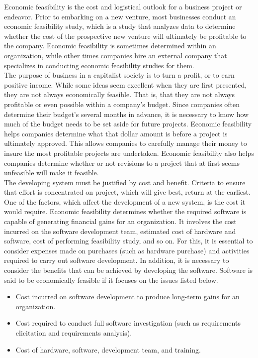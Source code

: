 Economic feasibility is the cost and logistical outlook for a business project or endeavor. Prior to embarking on a new venture, most businesses conduct an economic feasibility study, which is a study that analyzes data to determine whether the cost of the prospective new venture will ultimately be profitable to the company. Economic feasibility is sometimes determined within an organization, while other times companies hire an external company that specializes in conducting economic feasibility studies for them.\\

The purpose of business in a capitalist society is to turn a profit, or to earn positive income. While some ideas seem excellent when they are first presented, they are not always economically feasible. That is, that they are not always profitable or even possible within a company's budget. Since companies often determine their budget's several months in advance, it is necessary to know how much of the budget needs to be set aside for future projects. Economic feasibility helps companies determine what that dollar amount is before a project is ultimately approved. This allows companies to carefully manage their money to insure the most profitable projects are undertaken. Economic feasibility also helps companies determine whether or not revisions to a project that at first seems unfeasible will make it feasible.\\

The developing system must be justified by cost and benefit. Criteria to ensure that effort is concentrated on project, which will give best, return at the earliest. One of the factors, which affect the development of a new system, is the cost it would require. Economic feasibility determines whether the required software is capable of generating financial gains for an organization. It involves the cost incurred on the software development team, estimated cost of hardware and software, cost of performing feasibility study, and so on. For this, it is essential to consider expenses made on purchases (such as hardware purchase) and activities required to carry out software development. In addition, it is necessary to consider the benefits that can be achieved by developing the software. Software is said to be economically feasible if it focuses on the issues listed below.
\begin{itemize}
	\item Cost incurred on software development to produce long-term gains for an organization.
	\item Cost required to conduct full software investigation (such as requirements elicitation and requirements analysis).
	\item Cost of hardware, software, development team, and training.
\end{itemize}

